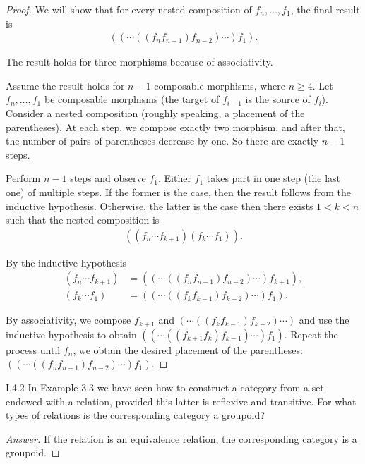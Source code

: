 \begin{proof}
	We will show that for every nested composition of $f_{n}, \ldots, f_{1}$, the final result is
	\begin{align*}
		((\cdots ((f_{n}f_{n-1})f_{n-2})\cdots)f_{1}).
	\end{align*}

	The result holds for three morphisms because of associativity.

	Assume the result holds for $n - 1$ composable morphisms, where $n\geq 4$. Let $f_{n}, \ldots, f_{1}$ be composable morphisms (the target of $f_{i-1}$ is the source of $f_{i}$). Consider a nested composition (roughly speaking, a placement of the parentheses). At each step, we compose exactly two morphism, and after that, the number of pairs of parentheses decrease by one. So there are exactly $n - 1$ steps.

	Perform $n - 1$ steps and observe $f_{1}$. Either $f_{1}$ takes part in one step (the last one) of multiple steps. If the former is the case, then the result follows from the inductive hypothesis. Otherwise, the latter is the case then there exists $1 < k < n$ such that the nested composition is
	\begin{align*}
		((f_{n}\cdots f_{k+1})(f_{k}\cdots f_{1})).
	\end{align*}

	By the inductive hypothesis
	\begin{align*}
		(f_{n}\cdots f_{k+1}) & = ((\cdots ((f_{n}f_{n-1})f_{n-2})\cdots)f_{k+1}), \\
		(f_{k}\cdots f_{1})   & = ((\cdots ((f_{k}f_{k-1})f_{k-2})\cdots)f_{1}).
	\end{align*}

	By associativity, we compose $f_{k+1}$ and $(\cdots ((f_{k}f_{k-1})f_{k-2})\cdots)$ and use the inductive hypothesis to obtain $((\cdots ((f_{k+1}f_{k})f_{k-1})\cdots)f_{1})$. Repeat the process until $f_{n}$, we obtain the desired placement of the parentheses: $((\cdots ((f_{n}f_{n-1})f_{n-2})\cdots)f_{1})$.
\end{proof}

\begin{exercise}{I.4.2}
	In Example 3.3 we have seen how to construct a category from a set endowed with a relation, provided this latter is reflexive and transitive. For what types of relations is the corresponding category a groupoid?
\end{exercise}

\begin{proof}[Answer]
	If the relation is an equivalence relation, the corresponding category is a groupoid.
\end{proof}


